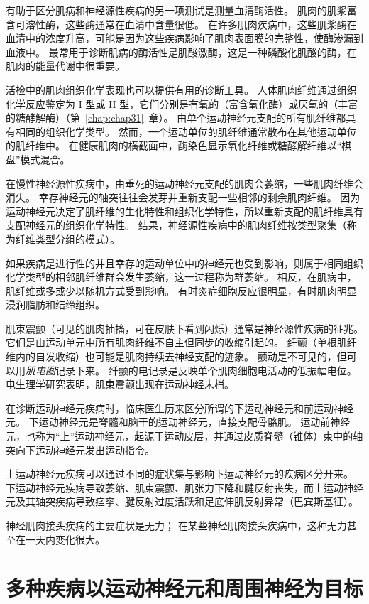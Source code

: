 有助于区分肌病和神经源性疾病的另一项测试是测量血清酶活性。
肌肉的肌浆富含可溶性酶，这些酶通常在血清中含量很低。
在许多肌肉疾病中，这些肌浆酶在血清中的浓度升高，可能是因为这些疾病影响了肌肉表面膜的完整性，使酶渗漏到血液中。
最常用于诊断肌病的酶活性是肌酸激酶，这是一种磷酸化肌酸的酶，在肌肉的能量代谢中很重要。


活检中的肌肉组织化学表现也可以提供有用的诊断工具。
人体肌肉纤维通过组织化学反应鉴定为 I 型或 II 型，它们分别是有氧的（富含氧化酶）或厌氧的（丰富的糖酵解酶）（第~\ref{chap:chap31}~章）。
由单个运动神经元支配的所有肌纤维都具有相同的组织化学类型。
然而，一个运动单位的肌纤维通常散布在其他运动单位的肌纤维中。
在健康肌肉的横截面中，酶染色显示氧化纤维或糖酵解纤维以“棋盘”模式混合。


在慢性神经源性疾病中，由垂死的运动神经元支配的肌肉会萎缩，一些肌肉纤维会消失。
幸存神经元的轴突往往会发芽并重新支配一些相邻的剩余肌肉纤维。
因为运动神经元决定了肌纤维的生化特性和组织化学特性，所以重新支配的肌纤维具有支配神经元的组织化学特性。
结果，神经源性疾病中的肌肉纤维按类型聚集（称为纤维类型分组的模式）。


如果疾病是进行性的并且幸存的运动单位中的神经元也受到影响，则属于相同组织化学类型的相邻肌纤维群会发生萎缩，这一过程称为群萎缩。
相反，在肌病中，肌纤维或多或少以随机方式受到影响。
有时炎症细胞反应很明显，有时肌肉明显浸润脂肪和结缔组织。


肌束震颤（可见的肌肉抽搐，可在皮肤下看到闪烁）通常是神经源性疾病的征兆。
它们是由运动单元中所有肌肉纤维不自主但同步的收缩引起的。
纤颤（单根肌纤维内的自发收缩）也可能是肌肉持续去神经支配的迹象。
颤动是不可见的，但可以用\textit{肌电图}记录下来。
纤颤的电记录是反映单个肌肉细胞电活动的低振幅电位。
电生理学研究表明，肌束震颤出现在运动神经末梢。


在诊断运动神经元疾病时，临床医生历来区分所谓的下运动神经元和前运动神经元。
下运动神经元是脊髓和脑干的运动神经元，直接支配骨骼肌。
运动前神经元，也称为“上”运动神经元，起源于运动皮层，并通过皮质脊髓（锥体）束中的轴突向下运动神经元发出运动指令。


上运动神经元疾病可以通过不同的症状集与影响下运动神经元的疾病区分开来。
下运动神经元疾病导致萎缩、肌束震颤、肌张力下降和腱反射丧失，而上运动神经元及其轴突疾病导致痉挛、腱反射过度活跃和足底伸肌反射异常（巴宾斯基征）。


神经肌肉接头疾病的主要症状是无力；
在某些神经肌肉接头疾病中，这种无力甚至在一天内变化很大。



\section{多种疾病以运动神经元和周围神经为目标}

